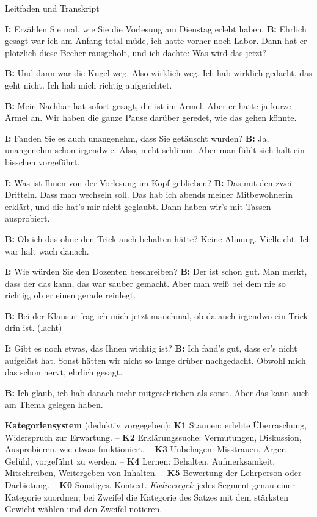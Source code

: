 \begin{uebungsblatt}{Leitfaden und Transkript}
\begin{small}
\begin{description}\setlength{\itemsep}{2pt}
\item[{[1]}] \textbf{I:} Erzählen Sie mal, wie Sie die Vorlesung am
  Dienstag erlebt haben. \textbf{B:} Ehrlich gesagt war ich am Anfang
  total müde, ich hatte vorher noch Labor. Dann hat er plötzlich diese
  Becher rausgeholt, und ich dachte: Was wird das jetzt?
\item[{[2]}] \textbf{B:} Und dann war die Kugel weg. Also wirklich weg.
  Ich hab wirklich gedacht, das geht nicht. Ich hab mich richtig
  aufgerichtet.
\item[{[3]}] \textbf{B:} Mein Nachbar hat sofort gesagt, die ist im
  Ärmel. Aber er hatte ja kurze Ärmel an. Wir haben die ganze Pause
  darüber geredet, wie das gehen könnte.
\item[{[4]}] \textbf{I:} Fanden Sie es auch unangenehm, dass Sie
  getäuscht wurden? \textbf{B:} Ja, unangenehm schon irgendwie. Also,
  nicht schlimm. Aber man fühlt sich halt ein bisschen vorgeführt.
\item[{[5]}] \textbf{I:} Was ist Ihnen von der Vorlesung im Kopf
  geblieben? \textbf{B:} Das mit den zwei Dritteln. Dass man wechseln
  soll. Das hab ich abends meiner Mitbewohnerin erklärt, und die hat's
  mir nicht geglaubt. Dann haben wir's mit Tassen ausprobiert.
\item[{[6]}] \textbf{B:} Ob ich das ohne den Trick auch behalten hätte?
  Keine Ahnung. Vielleicht. Ich war halt wach danach.
\item[{[7]}] \textbf{I:} Wie würden Sie den Dozenten beschreiben?
  \textbf{B:} Der ist schon gut. Man merkt, dass der das kann, das war
  sauber gemacht. Aber man weiß bei dem nie so richtig, ob er einen
  gerade reinlegt.
\item[{[8]}] \textbf{B:} Bei der Klausur frag ich mich jetzt manchmal,
  ob da auch irgendwo ein Trick drin ist. (lacht)
\item[{[9]}] \textbf{I:} Gibt es noch etwas, das Ihnen wichtig ist?
  \textbf{B:} Ich fand's gut, dass er's nicht aufgelöst hat. Sonst hätten
  wir nicht so lange drüber nachgedacht. Obwohl mich das schon nervt,
  ehrlich gesagt.
\item[{[10]}] \textbf{B:} Ich glaub, ich hab danach mehr mitgeschrieben
  als sonst. Aber das kann auch am Thema gelegen haben.
\end{description}
\end{small}

\textbf{Kategoriensystem} (deduktiv vorgegeben):
\textbf{K1} Staunen: erlebte Überraschung, Widerspruch zur Erwartung. --
\textbf{K2} Erklärungssuche: Vermutungen, Diskussion, Ausprobieren, wie
etwas funktioniert. -- \textbf{K3} Unbehagen: Misstrauen, Ärger, Gefühl,
vorgeführt zu werden. -- \textbf{K4} Lernen: Behalten, Aufmerksamkeit,
Mitschreiben, Weitergeben von Inhalten. -- \textbf{K5} Bewertung der
Lehrperson oder Darbietung. -- \textbf{K0} Sonstiges, Kontext.
\emph{Kodierregel:} jedes Segment genau einer Kategorie zuordnen; bei
Zweifel die Kategorie des Satzes mit dem stärksten Gewicht wählen und
den Zweifel notieren.


\end{uebungsblatt}

